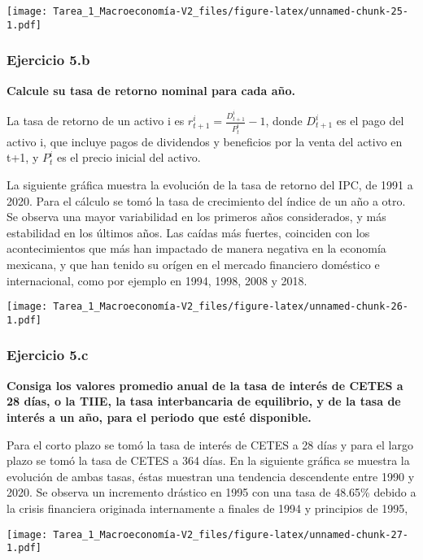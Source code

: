 \documentclass[
]{article}
\begin{document}
\texttt{[image: Tarea\_1\_Macroeconomía-V2\_files/figure-latex/unnamed-chunk-25-1.pdf]}

\newpage

\hypertarget{ejercicio-5.b}{%
\subsubsection{Ejercicio 5.b}\label{ejercicio-5.b}}

\textbf{Calcule su tasa de retorno nominal para cada año.}

La tasa de retorno de un activo i es
\(r^i_{t+1}=\frac{D^i_{t+1}}{P^i_t}-1\), donde \(D^i_{t+1}\) es el pago
del activo i, que incluye pagos de dividendos y beneficios por la venta
del activo en t+1, y \(P^i_t\) es el precio inicial del activo.

La siguiente gráfica muestra la evolución de la tasa de retorno del IPC,
de 1991 a 2020. Para el cálculo se tomó la tasa de crecimiento del
índice de un año a otro. Se observa una mayor variabilidad en los
primeros años considerados, y más estabilidad en los últimos años. Las
caídas más fuertes, coinciden con los acontecimientos que más han
impactado de manera negativa en la economía mexicana, y que han tenido
su orígen en el mercado financiero doméstico e internacional, como por
ejemplo en 1994, 1998, 2008 y 2018.

\texttt{[image: Tarea\_1\_Macroeconomía-V2\_files/figure-latex/unnamed-chunk-26-1.pdf]}

\newpage

\hypertarget{ejercicio-5.c}{%
\subsubsection{Ejercicio 5.c}\label{ejercicio-5.c}}

\textbf{Consiga los valores promedio anual de la tasa de interés de
CETES a 28 días, o la TIIE, la tasa interbancaria de equilibrio, y de la
tasa de interés a un año, para el periodo que esté disponible.}

Para el corto plazo se tomó la tasa de interés de CETES a 28 días y para
el largo plazo se tomó la tasa de CETES a 364 días. En la siguiente
gráfica se muestra la evolución de ambas tasas, éstas muestran una
tendencia descendente entre 1990 y 2020. Se observa un incremento
drástico en 1995 con una tasa de 48.65\% debido a la crisis financiera
originada internamente a finales de 1994 y principios de 1995,

\texttt{[image: Tarea\_1\_Macroeconomía-V2\_files/figure-latex/unnamed-chunk-27-1.pdf]}
\end{document}
